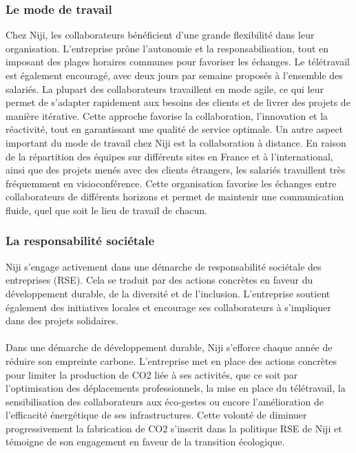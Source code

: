 \documentclass[12pt]{article}
\begin{document}
\subsubsection{Le mode de travail}
Chez Niji, les collaborateurs bénéficient d'une grande flexibilité dans leur organisation. L'entreprise prône l'autonomie et la responsabilisation, tout en imposant des plages horaires communes pour favoriser les échanges. Le télétravail est également encouragé, avec deux jours par semaine proposés à l'ensemble des salariés. La plupart des collaborateurs travaillent en mode agile, ce qui leur permet de s'adapter rapidement aux besoins des clients et de livrer des projets de manière itérative. Cette approche favorise la collaboration, l'innovation et la réactivité, tout en garantissant une qualité de service optimale.
Un autre aspect important du mode de travail chez Niji est la collaboration à distance. En raison de la répartition des équipes sur différents sites en France et à l'international, ainsi que des projets menés avec des clients étrangers, les salariés travaillent très fréquemment en visioconférence. Cette organisation favorise les échanges entre collaborateurs de différents horizons et permet de maintenir une communication fluide, quel que soit le lieu de travail de chacun.

\subsubsection{La responsabilité sociétale}
Niji s'engage activement dans une démarche de responsabilité sociétale des entreprises (RSE). Cela se traduit par des actions concrètes en faveur du développement durable, de la diversité et de l'inclusion. L'entreprise soutient également des initiatives locales et encourage ses collaborateurs à s'impliquer dans des projets solidaires.
\\\\
Dans une démarche de développement durable, Niji s'efforce chaque année de réduire son empreinte carbone. L'entreprise met en place des actions concrètes pour limiter la production de CO2 liée à ses activités, que ce soit par l'optimisation des déplacements professionnels, la mise en place du télétravail, la sensibilisation des collaborateurs aux éco-gestes ou encore l'amélioration de l'efficacité énergétique de ses infrastructures. Cette volonté de diminuer progressivement la fabrication de CO2 s'inscrit dans la politique RSE de Niji et témoigne de son engagement en faveur de la transition écologique.
\end{document}
